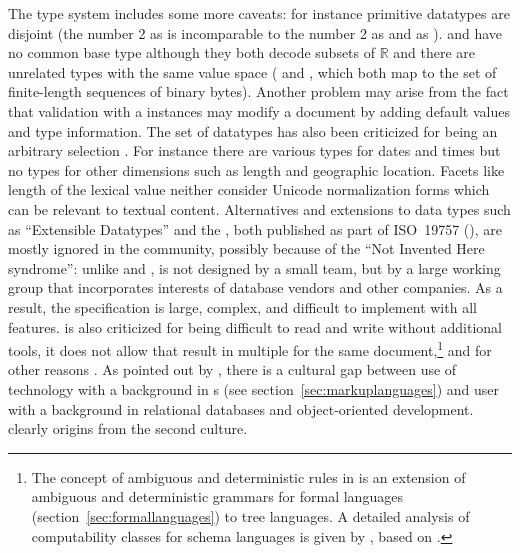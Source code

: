 The  type system includes some more caveats: for instance primitive
datatypes are disjoint (the number 2 as  is incomparable to the
number 2 as  and as ).  and
 have no common base type although they both decode subsets of
$\mathbb{R}$ and there are unrelated types with the same value space
( and , which both map to the set of
finite-length sequences of binary bytes). Another problem may arise from the
fact that validation with a  instances may modify a document by
adding default values and type information.  The set of  datatypes
has also been criticized for being an arbitrary selection \cite{Ogbuji2002}.
For instance there are various types for dates and times but no types for other
dimensions such as length and geographic location.  Facets like length of the
lexical value neither consider Unicode normalization forms which can be
relevant to textual content.  Alternatives and extensions to  data
types such as ``Extensible Datatypes'' and the , both published as part of ISO~19757
(\citeyear{ISO19757:2008}), are mostly ignored in the  community,
possibly because of the ``Not Invented Here syndrome'': unlike 
and ,  is not designed by a small team, but by a
large working group that incorporates interests of database vendors and other
companies. As a result, the specification is large, complex, and difficult to
implement with all features.  is also criticized for being difficult
to read and write without additional tools, it does not allow  that result in multiple  for the
same  document,\footnote{The concept of ambiguous and deterministic
rules in  is an extension of ambiguous and deterministic grammars for
formal languages (section~\ref{sec:formallanguages}) to tree languages. A
detailed analysis of computability classes for  schema languages is
given by \textcite{Stuehrenberg2010}, based on \textcite{Murata2005}.} and for
other reasons \cite{Clark2002}. As pointed out by \textcite{Ogbuji2002}, there
is a cultural gap between use of  technology with a background in
s (see section~\ref{sec:markuplanguages}) and user with a
background in relational databases and object-oriented development.  
clearly origins from the second culture. 

